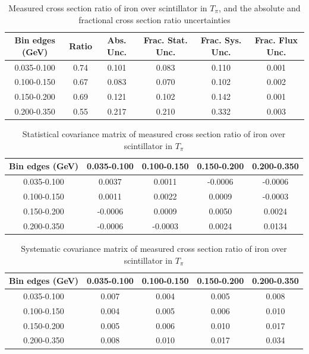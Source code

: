 \documentclass[../main.tex]{subfiles}
\begin{document}
\begin{table}
  \centering
  \renewcommand{\arraystretch}{1.15}
  \caption{Measured cross section ratio of iron over scintillator in $T_{\pi}$, and the absolute and fractional cross section ratio uncertainties}
    \begin{tabular}{c||c|c||c|c|c}
      Bin edges (GeV) &  Ratio  &  Abs. Unc.  &  Frac. Stat. Unc.  &  Frac. Sys. Unc.  &  Frac. Flux Unc. \\
      \hline
      \hline
      0.035-0.100 & 0.74 & 0.101 & 0.083 & 0.110 & 0.001\\
      0.100-0.150 & 0.67 & 0.083 & 0.070 & 0.102 & 0.002\\
      0.150-0.200 & 0.69 & 0.121 & 0.102 & 0.142 & 0.001\\
      0.200-0.350 & 0.55 & 0.217 & 0.210 & 0.332 & 0.003
    \end{tabular}
  \label{tbl:rationucleonnuc26pion_ekina}
\end{table}
\begin{table}
  \centering
  \renewcommand{\arraystretch}{1.15}
  \caption{Statistical covariance matrix of measured cross section ratio of iron over scintillator in $T_{\pi}$}
    \begin{tabular}{c||cccc}
      Bin edges (GeV) & 0.035-0.100 & 0.100-0.150 & 0.150-0.200 & 0.200-0.350\\
      \hline
      \hline
      0.035-0.100 & 0.0037 & 0.0011 & -0.0006 & -0.0006\\
      0.100-0.150 & 0.0011 & 0.0022 & 0.0009 & -0.0003\\
      0.150-0.200 & -0.0006 & 0.0009 & 0.0050 & 0.0024\\
      0.200-0.350 & -0.0006 & -0.0003 & 0.0024 & 0.0134
    \end{tabular}
  \label{tbl:rationucleonnuc26pion_ekinb}
\end{table}
\begin{table}
  \centering
  \renewcommand{\arraystretch}{1.15}
  \caption{Systematic covariance matrix of measured cross section ratio of iron over scintillator in $T_{\pi}$}
    \begin{tabular}{c||cccc}
      Bin edges (GeV) & 0.035-0.100 & 0.100-0.150 & 0.150-0.200 & 0.200-0.350\\
      \hline
      \hline
      0.035-0.100 & 0.007 & 0.004 & 0.005 & 0.008\\
      0.100-0.150 & 0.004 & 0.005 & 0.006 & 0.010\\
      0.150-0.200 & 0.005 & 0.006 & 0.010 & 0.017\\
      0.200-0.350 & 0.008 & 0.010 & 0.017 & 0.034
    \end{tabular}
  \label{tbl:rationucleonnuc26pion_ekinc}
\end{table}
\end{document}
